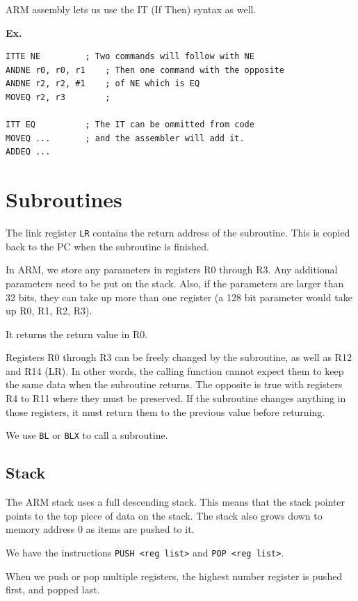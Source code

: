 \documentclass[12pt,letterpaper]{article} \usepackage{amsmath} \usepackage{graphicx} \usepackage[margin=1in]{geometry} \usepackage{longtable}  \usepackage{amssymb}
\begin{document}
	ARM assembly lets us use the IT (If Then) syntax as well. 
	\begin{mdframed}
		\textbf{Ex.} 
		\begin{lstlisting}
ITTE NE			; Two commands will follow with NE
ANDNE r0, r0, r1	; Then one command with the opposite
ANDNE r2, r2, #1	; of NE which is EQ
MOVEQ r2, r3		;

ITT EQ			; The IT can be ommitted from code
MOVEQ ...		; and the assembler will add it.
ADDEQ ...
		\end{lstlisting}
	\end{mdframed}
	
	\section{Subroutines}
	The link register \verb*|LR| contains the return address of the subroutine. This is copied back to the PC when the subroutine is finished. 
	
	In ARM, we store any parameters in registers R0 through R3. Any additional parameters need to be put on the stack. Also, if the parameters are larger than 32 bits, they can take up more than one register (a 128 bit parameter would take up R0, R1, R2, R3).
	
	It returns the return value in R0.
	
	Registers R0 through R3 can be freely changed by the subroutine, as well as R12 and R14 (LR). In other words, the calling function cannot expect them to keep the same data when the subroutine returns. The opposite is true with registers R4 to R11 where they must be preserved. If the subroutine changes anything in those registers, it must return them to the previous value before returning. 
	
	We use \verb*|BL| or \verb*|BLX| to call a subroutine. 
	
	\subsection{Stack}
	The ARM stack uses a full descending stack. This means that the stack pointer points to the top piece of data on the stack. The stack also grows down to memory address 0 as items are pushed to it. 
	
	We have the instructions \verb*|PUSH <reg list>| and \verb*|POP <reg list>|. 
	
	When we push or pop multiple registers, the highest number register is pushed first, and popped last. 
	
\end{document}
